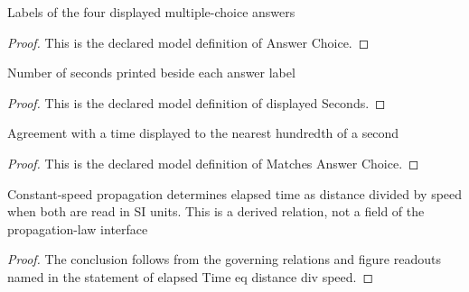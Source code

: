 \begin{definition}
  \label{def:physics:phyx-mini-0215:phyxminiproblems-problemphyxmini0215-answerchoice}
  Labels of the four displayed multiple-choice answers
\end{definition}
\begin{proof}
  This is the declared model definition of Answer Choice.
\end{proof}
\begin{definition}
  \label{def:physics:phyx-mini-0215:phyxminiproblems-problemphyxmini0215-answerchoice-displayedseconds}
  Number of seconds printed beside each answer label
\end{definition}
\begin{proof}
  This is the declared model definition of displayed Seconds.
\end{proof}
\begin{definition}
  \label{def:physics:phyx-mini-0215:phyxminiproblems-problemphyxmini0215-matchesanswerchoice}
  Agreement with a time displayed to the nearest hundredth of a second
\end{definition}
\begin{proof}
  This is the declared model definition of Matches Answer Choice.
\end{proof}
\begin{lemma}
  \label{lem:physics:phyx-mini-0215:phyxminiproblems-problemphyxmini0215-elapsedtime-eq-distance-div-speed}
  Constant-speed propagation determines elapsed time as distance divided by speed when both are read in SI units. This is a derived relation, not a field of the propagation-law interface
\end{lemma}
\begin{proof}
  The conclusion follows from the governing relations and figure readouts named in the statement of elapsed Time eq distance div speed.
\end{proof}
